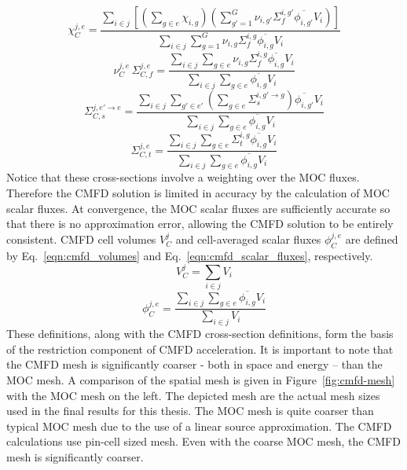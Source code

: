 \begin{equation}
	\chi_C^{j,e} = \frac{\sum_{i \in j} \left[ \left(\sum_{g \in e} \chi_{i,g} \right) \left(\sum_{g'=1}^{G} \nu_{i, g'} \Sigma_f^{i,g'} \overline{\phi_{i,g'}} V_i \right)\right]}{\sum_{i \in j} \sum_{g=1}^{G} \nu_{i, g} \Sigma_f^{i,g} \overline{\phi_{i,g}} V_i}
	\label{eqn:cmfd-xs-chi}
\end{equation}
\begin{equation}
	\nu_C^{j,e} \, \Sigma_{C,f}^{j,e} = \frac{\sum_{i \in j} \sum_{g \in e} \nu_{i, g} \Sigma_f^{i,g} \overline{\phi_{i,g}} V_i}{\sum_{i \in j} \sum_{g \in e} \overline{\phi_{i,g}} V_i}
\end{equation}
\begin{equation}
	\Sigma_{C,s}^{j, e' \rightarrow e} = \frac{\sum_{i \in j} \sum_{g'\in e'} \left(\sum_{g \in e} \Sigma_{s}^{i, g' \rightarrow g} \right) \overline{\phi_{i,g'}} V_i}{\sum_{i \in j} \sum_{g\in e} \overline{\phi_{i,g}} V_i}
\end{equation}
\begin{equation}
	\Sigma_{C,t}^{j, e} = \frac{\sum_{i \in j} \sum_{g \in e} \Sigma_{t}^{i, g} \overline{\phi_{i,g}} V_i}{\sum_{i \in j} \sum_{g\in e} \overline{\phi_{i,g}} V_i}
	\label{eqn:cmfd-xs-total}
\end{equation}
Notice that these cross-sections involve a weighting over the MOC fluxes. Therefore the CMFD solution is limited in accuracy by the calculation of MOC scalar fluxes. At convergence, the MOC scalar fluxes are sufficiently accurate so that there is no approximation error, allowing the CMFD solution to be entirely consistent. CMFD cell volumes $V_C^j$ and cell-averaged scalar fluxes $\phi_C^{j,e}$ are defined by Eq.~\ref{eqn:cmfd_volumes} and Eq.~\ref{eqn:cmfd_scalar_fluxes}, respectively.
\begin{equation}
	V_C^j = \sum_{i \in j} V_i
	\label{eqn:cmfd_volumes}
\end{equation}
\begin{equation}
\phi_C^{j,e} = \frac{\sum_{i \in j} \sum_{g \in e} \overline{\phi_{i,g}} V_i}{\sum_{i \in j} V_i}
\label{eqn:cmfd_scalar_fluxes}
\end{equation}
These definitions, along with the CMFD cross-section definitions, form the basis of the restriction component of CMFD acceleration. It is important to note that the CMFD mesh is significantly coarser - both in space and energy -- than the MOC mesh. A comparison of the spatial mesh is given in Figure~\ref{fig:cmfd-mesh} with the MOC mesh on the left. The depicted mesh are the actual mesh sizes used in the final results for this thesis. The MOC mesh is quite coarser than typical MOC mesh due to the use of a linear source approximation. The CMFD calculations use pin-cell sized mesh. Even with the coarse MOC mesh, the CMFD mesh is significantly coarser.
